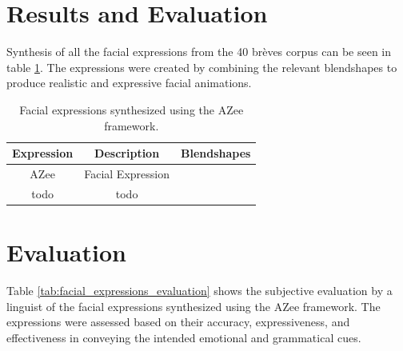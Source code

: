 \documentclass[../../main.tex]{subfiles}
\begin{document}
\section{Results and Evaluation}
\label{ch:facial_expressions:results}

Synthesis of all the facial expressions from the 40 brèves corpus can be seen in table \ref{tab:facial_expressions}. The expressions were created by combining the relevant blendshapes  to produce realistic and expressive facial animations.


\begin{table}
    \centering
    \begin{tabular}{|c|c|c|}
        \hline
        \textbf{Expression} & \textbf{Description} & \textbf{Blendshapes} \\
        \hline
        AZee & Facial Expression \\
        todo & todo \\
    \end{tabular}
    \caption{Facial expressions synthesized using the AZee framework.}
    \label{tab:facial_expressions}
\end{table}

\section{Evaluation}
\label{ch:facial_expressions:evaluation}

Table \ref{tab:facial_expressions_evaluation} shows the subjective evaluation by a linguist of the facial expressions synthesized using the AZee framework. The expressions were assessed based on their accuracy, expressiveness, and effectiveness in conveying the intended emotional and grammatical cues.
\end{document}
